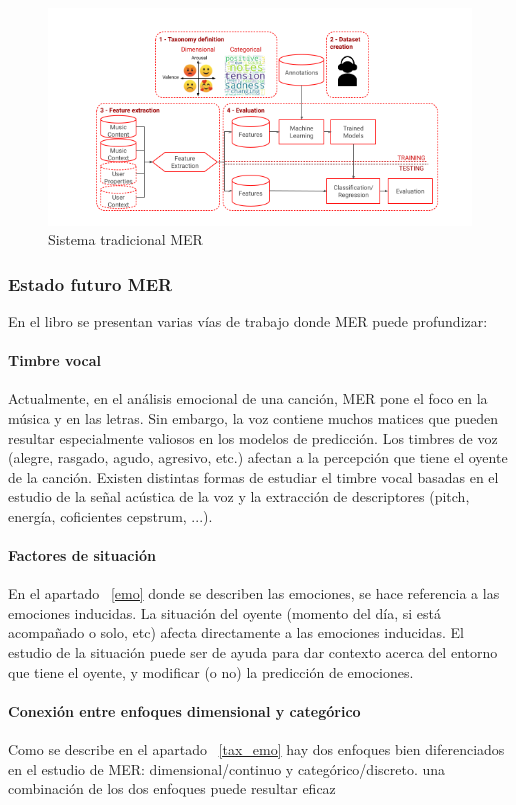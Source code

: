 \documentclass[12pt,a4paper,Spanish]{article}
\begin{document}
\begin{figure}[H]
	\centering
	\includegraphics[width=0.7\linewidth]{figs/mer_traditional_system}
	\caption{Sistema tradicional MER}
	\label{fig:mertraditionalsystem}
\end{figure}


\subsubsection{Estado futuro MER}
En el libro  se presentan varias vías de trabajo donde MER puede profundizar:

\paragraph{Timbre vocal}
Actualmente, en el análisis emocional de una canción, MER pone el foco en la música y en las letras. Sin embargo, la voz contiene muchos matices que pueden resultar  especialmente valiosos en los modelos de predicción. Los timbres de voz (alegre, rasgado, agudo, agresivo, etc.) afectan a la percepción que tiene el oyente de la canción.
\newline
Existen distintas formas de estudiar el timbre vocal basadas en el estudio de la señal acústica de la voz y la extracción de descriptores (pitch, energía, coficientes cepstrum, ...).

\paragraph{Factores de situación}
En el apartado ~\ref{emo} donde se describen las emociones, se hace referencia a las emociones inducidas. La situación del oyente (momento del día, si está acompañado o solo, etc) afecta directamente a las emociones inducidas. El estudio de la situación puede ser de ayuda para dar contexto acerca del entorno que tiene el oyente, y modificar (o no) la predicción de emociones.

\paragraph{Conexión entre enfoques dimensional y categórico}
Como se describe en el apartado ~\ref{tax_emo} hay dos enfoques bien diferenciados en el estudio de MER: dimensional/continuo y categórico/discreto. una combinación de los dos enfoques puede resultar eficaz
\end{document}
